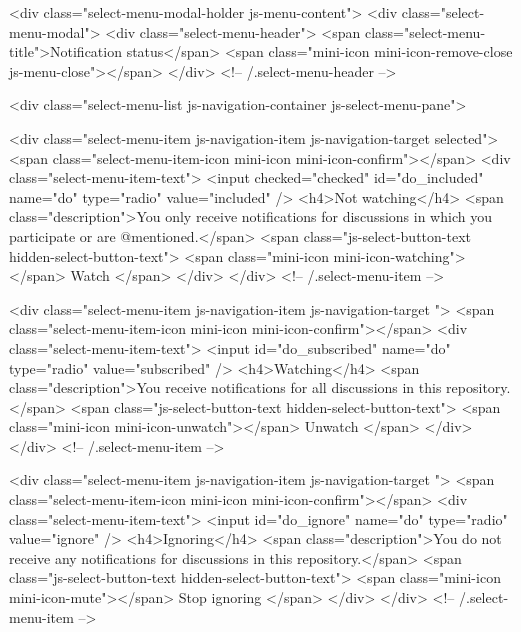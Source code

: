       <div class="select-menu-modal-holder js-menu-content">
        <div class="select-menu-modal">
          <div class="select-menu-header">
            <span class="select-menu-title">Notification status</span>
            <span class="mini-icon mini-icon-remove-close js-menu-close"></span>
          </div> <!-- /.select-menu-header -->

          <div class="select-menu-list js-navigation-container js-select-menu-pane">

            <div class="select-menu-item js-navigation-item js-navigation-target selected">
              <span class="select-menu-item-icon mini-icon mini-icon-confirm"></span>
              <div class="select-menu-item-text">
                <input checked="checked" id="do_included" name="do" type="radio" value="included" />
                <h4>Not watching</h4>
                <span class="description">You only receive notifications for discussions in which you participate or are @mentioned.</span>
                <span class="js-select-button-text hidden-select-button-text">
                  <span class="mini-icon mini-icon-watching"></span>
                  Watch
                </span>
              </div>
            </div> <!-- /.select-menu-item -->

            <div class="select-menu-item js-navigation-item js-navigation-target ">
              <span class="select-menu-item-icon mini-icon mini-icon-confirm"></span>
              <div class="select-menu-item-text">
                <input id="do_subscribed" name="do" type="radio" value="subscribed" />
                <h4>Watching</h4>
                <span class="description">You receive notifications for all discussions in this repository.</span>
                <span class="js-select-button-text hidden-select-button-text">
                  <span class="mini-icon mini-icon-unwatch"></span>
                  Unwatch
                </span>
              </div>
            </div> <!-- /.select-menu-item -->

            <div class="select-menu-item js-navigation-item js-navigation-target ">
              <span class="select-menu-item-icon mini-icon mini-icon-confirm"></span>
              <div class="select-menu-item-text">
                <input id="do_ignore" name="do" type="radio" value="ignore" />
                <h4>Ignoring</h4>
                <span class="description">You do not receive any notifications for discussions in this repository.</span>
                <span class="js-select-button-text hidden-select-button-text">
                  <span class="mini-icon mini-icon-mute"></span>
                  Stop ignoring
                </span>
              </div>
            </div> <!-- /.select-menu-item -->

